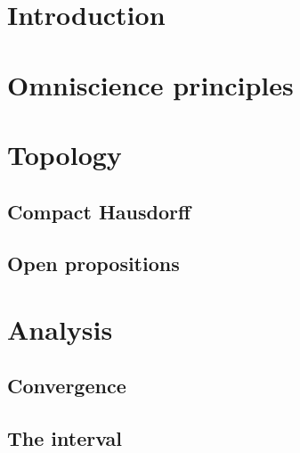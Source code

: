 \documentclass{../util/zariski-small}
\begin{document}
\appendix
{}
\section*{Introduction}

%

\section{Omniscience principles}


\section{Topology}

\subsection{Compact Hausdorff}



\subsection{Open propositions}


\section{Analysis}

\subsection{Convergence}



\subsection{The interval}
%


\printbibliography
\end{document}
